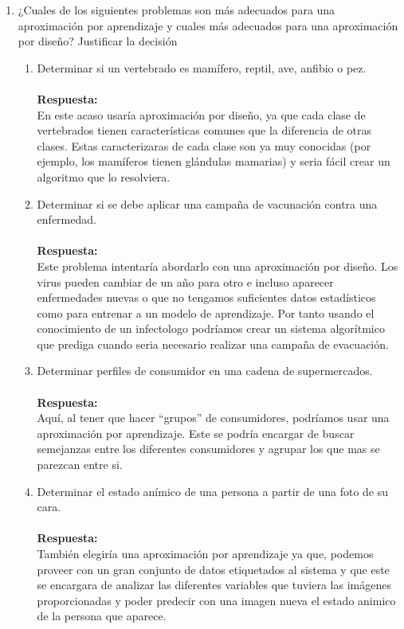 \documentclass[12pt,a4paper]{article}
\begin{document}
\begin{enumerate}
	\item ¿Cuales de los siguientes problemas son más adecuados para una aproximación por aprendizaje y cuales más adecuados para una aproximación por diseño? Justificar la decisión
	\begin{enumerate}
		\item Determinar si un vertebrado es mamífero, reptil, ave, anfibio o pez.\\\\		\textbf{Respuesta:}\\
		En este acaso usaría aproximación por diseño, ya que cada clase de vertebrados tienen características comunes que la diferencia de otras clases. Estas caracterizaras de cada clase son ya muy conocidas (por ejemplo, los mamíferos tienen glándulas mamarias) y seria fácil crear un algoritmo que lo resolviera.
		\item Determinar si se debe aplicar una campaña de vacunación contra una enfermedad.\\\\		\textbf{Respuesta:}\\
		Este problema intentaría abordarlo con una aproximación por diseño. Los virus pueden cambiar de un año para otro e incluso aparecer enfermedades nuevas o que no tengamos suficientes datos estadísticos como para entrenar a un modelo de aprendizaje. Por tanto usando el conocimiento de un infectologo podríamos crear un sistema algorítmico que prediga cuando seria necesario realizar  una campaña de evacuación. 
		\item Determinar perfiles de consumidor en una cadena de supermercados.\\\\		\textbf{Respuesta:}\\
		Aquí, al tener que hacer ``grupos'' de consumidores, podríamos usar una aproximación por aprendizaje. Este se podría encargar de buscar semejanzas entre los diferentes consumidores y agrupar los que mas se parezcan entre si.
		\item Determinar el estado anímico de una persona a partir de una foto de su cara.\\\\		\textbf{Respuesta:}\\
		También elegiría una aproximación por aprendizaje ya que, podemos proveer con un gran conjunto de datos etiquetados al sistema y que este se encargara de analizar las diferentes variables  que tuviera las imágenes proporcionadas y poder predecir con una imagen nueva el estado animico de la persona que aparece. 

\end{enumerate}
\end{enumerate}
\end{document}
